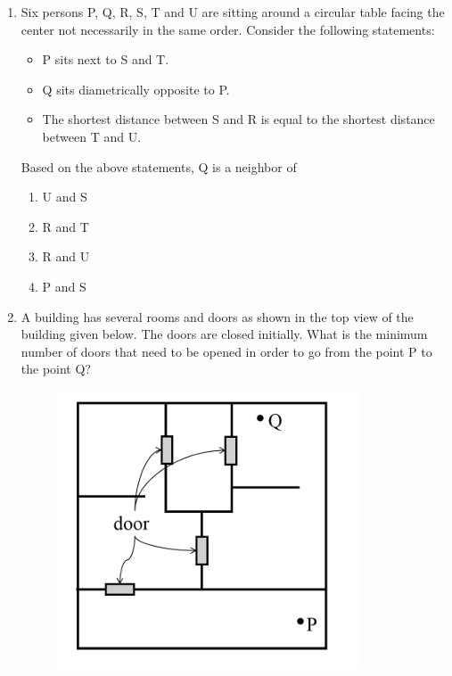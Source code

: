 \documentclass[journal,12pt,onecolumn]{IEEEtran}
\theoremstyle{remark}
\begin{document}
\begin{enumerate}
    \hfill{}
    \begin{enumerate}
    \end{enumerate}

    \item Six persons P, Q, R, S, T and U are sitting around a circular table facing the center not necessarily in the same order. Consider the following statements:
    \begin{itemize}
        \item P sits next to S and T.
        \item Q sits diametrically opposite to P.
        \item The shortest distance between S and R is equal to the shortest distance between T and U.
    \end{itemize}
    Based on the above statements, Q is a neighbor of

    \hfill{}
    \begin{enumerate}
        \item U and S
        \item R and T
        \item R and U
        \item P and S
    \end{enumerate}

    \item A building has several rooms and doors as shown in the top view of the building given below. The doors are closed initially. What is the minimum number of doors that need to be opened in order to go from the point P to the point Q?
    \begin{figure}[H]
        \centering
        \includegraphics[width=0.5\columnwidth]{q5.png}
        \caption*{}
        \label{fig:q5}
    \end{figure}


\end{enumerate}
\end{document}
